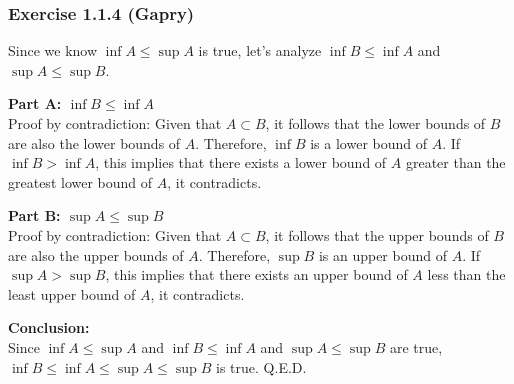 \subsubsection*{Exercise 1.1.4 (Gapry)}

\begin{flushleft}
Since we know $\inf A \le \sup A$ is true, let's analyze $\inf B \le \inf A$ and $\sup A \le \sup B$.

\textbf{Part A: $\inf B \le \inf A$} \\
Proof by contradiction: 
Given that $A \subset B$, it follows that the lower bounds of $B$ are also the lower bounds of $A$. 
Therefore, $\inf B$ is a lower bound of $A$. If $\inf B > \inf A$, 
this implies that there exists a lower bound of $A$ greater than the greatest lower bound of $A$, 
it contradicts.

\textbf{Part B: $\sup A \le \sup B$} \\
Proof by contradiction: 
Given that $A \subset B$, it follows that the upper bounds of $B$ are also the upper bounds of $A$. 
Therefore, $\sup B$ is an upper bound of $A$. If $\sup A > \sup B$, 
this implies that there exists an upper bound of $A$ less than the least upper bound of $A$, 
it contradicts.

\textbf{Conclusion:} \\
Since $\inf A \le \sup A$ and $\inf B \le \inf A$ and $\sup A \le \sup B$ are true, 
$\inf B \le \inf A \le \sup A \le \sup B$ is true. Q.E.D.
\end{flushleft}
